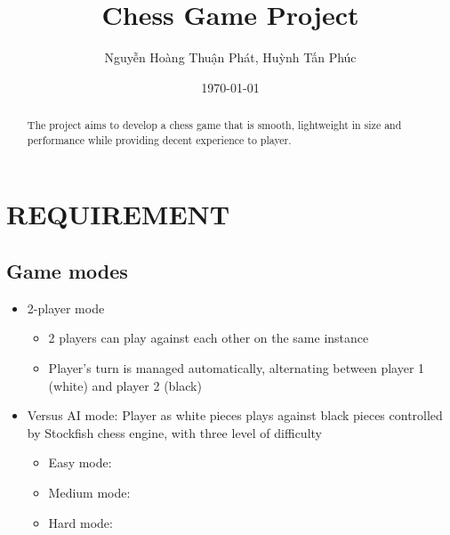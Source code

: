 \documentclass[a4paper, 10pt, titlepage]{article}
\title{Chess Game Project}
\author{Nguyễn Hoàng Thuận Phát, Huỳnh Tấn Phúc}
\date{\selectlanguage{english}\today}
\begin{document}
\maketitle
{}
\renewcommand{\abstractname}{Overview}
\begin{abstract}
    The project aims to develop a chess game that is smooth, lightweight in size and performance while providing decent experience to player.
\end{abstract}


\section{REQUIREMENT}

\subsection{Game modes}
\begin{itemize}
    \item 2-player mode
          \begin{itemize}
              \item 2 players can play against each other on the same instance
              \item Player's turn is managed automatically, alternating between player 1 (white) and player 2 (black)
          \end{itemize}
    \item Versus AI mode: Player as white pieces plays against black pieces controlled by Stockfish chess engine, with three level of difficulty
          \begin{itemize}
              \item Easy mode:
              \item Medium mode:
              \item Hard mode:
          \end{itemize}
\end{itemize}
\end{document}

